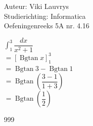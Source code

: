 \documentclass[a4paper]{article}
\begin{document}
  
\noindent \large Auteur: Viki	Lauvrys \\
\noindent \large Studierichting: Informatica\\
\noindent \large Oefeningenreeks 5A nr. 4.16\\

\medskip

\normalsize

$ \displaystyle\int^3_1 \dfrac{dx}{x^2 +1} $ \\

$ = \left[ \operatorname{Bgtan} x \right]^3_1 $ \\

$ = \operatorname{Bgtan} 3 - \operatorname{Bgtan} 1 $ \\

$ = \operatorname{Bgtan} \left( \dfrac{3-1}{1+3} \right) $ \\

$ = \operatorname{Bgtan} \left( \dfrac{1}{2} \right) $ \\

\begin{thebibliography}{999}
\end{thebibliography}
\end{document}
